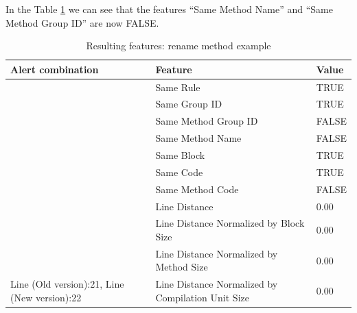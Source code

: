 \documentclass[
]{article}
\begin{document}
\newpage

In the Table \ref{features_rename} we can see that the features ``Same
Method Name'' and ``Same Method Group ID'' are now FALSE.

\small

\begin{table}[!h]

\caption{\label{tab:unnamed-chunk-13}Resulting features: rename method example \label{features_rename} }
\centering
\begin{tabular}[t]{l|l|l}
\hline
Alert combination & Feature & Value\\
\hline
\rowcolor{gray!6}   & Same Rule & TRUE\\

 & Same Group ID & TRUE\\

\rowcolor{gray!6}   & Same Method Group ID & FALSE\\

 & Same Method Name & FALSE\\

\rowcolor{gray!6}   & Same Block & TRUE\\

 & Same Code & TRUE\\

\rowcolor{gray!6}   & Same Method Code & FALSE\\

 & Line Distance & 0.00\\

\rowcolor{gray!6}   & Line Distance Normalized by Block Size & 0.00\\

 & Line Distance Normalized by Method Size & 0.00\\

\multirow[t]{-11}{*}{\raggedright\arraybackslash Line (Old version):21, Line (New version):22} & Line Distance Normalized by Compilation Unit Size & 0.00\\
\hline
\end{tabular}
\end{table}

\normalsize

\newpage
\end{document}
